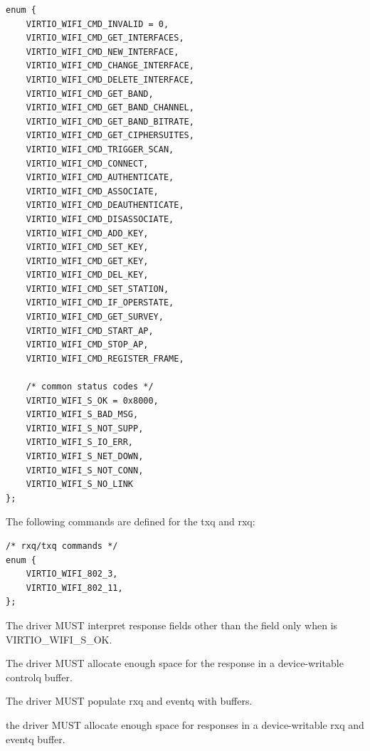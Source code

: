 \begin{lstlisting}
enum {
	VIRTIO_WIFI_CMD_INVALID = 0,
	VIRTIO_WIFI_CMD_GET_INTERFACES,
	VIRTIO_WIFI_CMD_NEW_INTERFACE,
	VIRTIO_WIFI_CMD_CHANGE_INTERFACE,
	VIRTIO_WIFI_CMD_DELETE_INTERFACE,
	VIRTIO_WIFI_CMD_GET_BAND,
	VIRTIO_WIFI_CMD_GET_BAND_CHANNEL,
	VIRTIO_WIFI_CMD_GET_BAND_BITRATE,
	VIRTIO_WIFI_CMD_GET_CIPHERSUITES,
	VIRTIO_WIFI_CMD_TRIGGER_SCAN,
	VIRTIO_WIFI_CMD_CONNECT,
	VIRTIO_WIFI_CMD_AUTHENTICATE,
	VIRTIO_WIFI_CMD_ASSOCIATE,
	VIRTIO_WIFI_CMD_DEAUTHENTICATE,
	VIRTIO_WIFI_CMD_DISASSOCIATE,
	VIRTIO_WIFI_CMD_ADD_KEY,
	VIRTIO_WIFI_CMD_SET_KEY,
	VIRTIO_WIFI_CMD_GET_KEY,
	VIRTIO_WIFI_CMD_DEL_KEY,
	VIRTIO_WIFI_CMD_SET_STATION,
	VIRTIO_WIFI_CMD_IF_OPERSTATE,
	VIRTIO_WIFI_CMD_GET_SURVEY,
	VIRTIO_WIFI_CMD_START_AP,
	VIRTIO_WIFI_CMD_STOP_AP,
	VIRTIO_WIFI_CMD_REGISTER_FRAME,

	/* common status codes */
	VIRTIO_WIFI_S_OK = 0x8000,
	VIRTIO_WIFI_S_BAD_MSG,
	VIRTIO_WIFI_S_NOT_SUPP,
	VIRTIO_WIFI_S_IO_ERR,
	VIRTIO_WIFI_S_NET_DOWN,
	VIRTIO_WIFI_S_NOT_CONN,
	VIRTIO_WIFI_S_NO_LINK
};
\end{lstlisting}

The following commands are defined for the txq and rxq:

\begin{lstlisting}
/* rxq/txq commands */
enum {
	VIRTIO_WIFI_802_3,
	VIRTIO_WIFI_802_11,
};
\end{lstlisting}


The driver MUST interpret response fields other than the  field  only when  is
VIRTIO_WIFI_S_OK.

The driver MUST allocate enough space for the response in a
device-writable controlq buffer.

The driver MUST populate rxq and eventq with buffers.

the driver MUST allocate enough space for responses in a device-writable rxq and eventq buffer.


